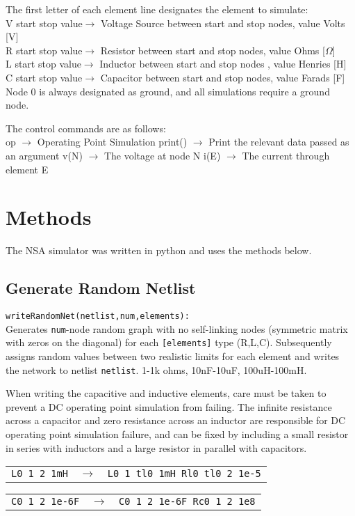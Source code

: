 The first letter of each element line designates the element to simulate: \\
V start stop value$\rightarrow$ Voltage Source between start and stop nodes, value Volts [V]\\
R start stop value$\rightarrow$ Resistor between start and stop nodes, value Ohms [$\Omega$]\\
L start stop value$\rightarrow$ Inductor between start and stop nodes , value Henries [H]\\
C start stop value$\rightarrow$ Capacitor between start and stop nodes, value Farads [F]\\

Node 0 is always designated as ground, and all simulations require a ground node.

The control commands are as follows:\\
op $\rightarrow$ Operating Point Simulation
print() $\rightarrow$ Print the relevant data passed as an argument
v(N) $\rightarrow$ The voltage at node N
i(E) $\rightarrow$ The current through element E

\section{Methods}
The NSA simulator was written in python and uses the methods below.

\subsection{Generate Random Netlist}
\texttt{writeRandomNet(netlist,num,elements):}\\
Generates \texttt{num}-node random graph with no self-linking nodes (symmetric matrix with zeros on the diagonal) for each \texttt{[elements]} type (R,L,C).
Subsequently assigns random values between two realistic limits for each element and writes the network to netlist \texttt{netlist}.
1-1k ohms, 10nF-10uF, 100uH-100mH.

When writing the capacitive and inductive elements, care must be taken to prevent a DC operating point simulation from failing.
The infinite resistance across a capacitor and zero resistance across an inductor are responsible for DC operating point simulation failure, and can be fixed by including a small resistor in series with inductors and a large resistor in parallel with capacitors. 

\begin{tabular}{ c c  p{3cm} }
\texttt{L0 1 2 1mH} & $\rightarrow$ & \texttt{L0 1 tl0 1mH Rl0 tl0 2 1e-5} \\
\end{tabular}
\begin{tabular}{ |c  c  p{3cm} }
\texttt{C0 1 2 1e-6F} & $\rightarrow$ & \texttt{C0 1 2 1e-6F Rc0 1 2 1e8} \\
\end{tabular}

